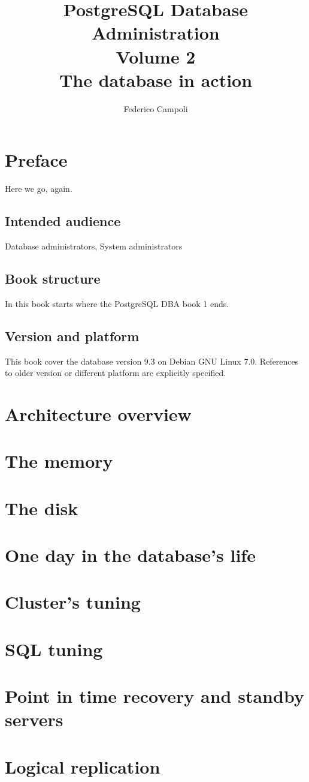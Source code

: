 \documentclass[oneside]{book}
\author{Federico Campoli}
\title{PostgreSQL Database Administration \\ Volume 2 \\ The database in action}
\begin{document}
\maketitle

\newpage{}



\tableofcontents{}

\chapter*{Preface}
Here we go, again. 




\section*{Intended audience}
Database administrators, System administrators

\section*{Book structure}
In this book starts where the PostgreSQL DBA book 1 ends.\newlinechar


\section*{Version and platform}
This book cover the database version 9.3 on Debian GNU Linux 7.0.
References to older version or different platform are explicitly specified.

\chapter{Architecture overview}
\chapter{The memory}
\chapter{The disk}
\chapter{One day in the database's life}
\chapter{Cluster's tuning}
\chapter{SQL tuning}
\chapter{Point in time recovery and standby servers}
\chapter{Logical replication}

\appendix

\listoffigures
\listoftables
\printindex{}
\end{document}
